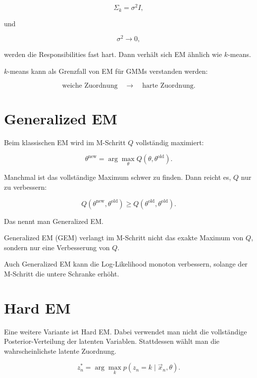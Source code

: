 \[
    \Sigma_k=\sigma^2 I,
\]

und

\[
    \sigma^2
    \to
    0,
\]

werden die Responsibilities fast hart.
Dann verhält sich EM ähnlich wie \(k\)-means.

\begin{conceptbox}
\(k\)-means kann als Grenzfall von EM für GMMs verstanden werden:

\[
    \text{weiche Zuordnung}
    \quad
    \longrightarrow
    \quad
    \text{harte Zuordnung}.
\]
\end{conceptbox}

\section{Generalized EM}

Beim klassischen EM wird im M-Schritt \(Q\) vollständig maximiert:

\[
    \theta^{\mathrm{new}}
    =
    \arg\max_{\theta}
    Q(\theta,\theta^{\mathrm{old}}).
\]

Manchmal ist das vollständige Maximum schwer zu finden.
Dann reicht es, \(Q\) nur zu verbessern:

\[
    Q(\theta^{\mathrm{new}},\theta^{\mathrm{old}})
    \geq
    Q(\theta^{\mathrm{old}},\theta^{\mathrm{old}}).
\]

Das nennt man Generalized EM.

\begin{definitionbox}
Generalized EM (GEM) verlangt im M-Schritt nicht das exakte Maximum von \(Q\), sondern nur eine Verbesserung von \(Q\).
\end{definitionbox}

\begin{notebox}
Auch Generalized EM kann die Log-Likelihood monoton verbessern, solange der M-Schritt die untere Schranke erhöht.
\end{notebox}

\section{Hard EM}

Eine weitere Variante ist Hard EM.
Dabei verwendet man nicht die vollständige Posterior-Verteilung der latenten Variablen.
Stattdessen wählt man die wahrscheinlichste latente Zuordnung.

\[
    z_n^{*}
    =
    \arg\max_k
    p(z_n=k\mid\vec{x}_n,\theta).
\]

